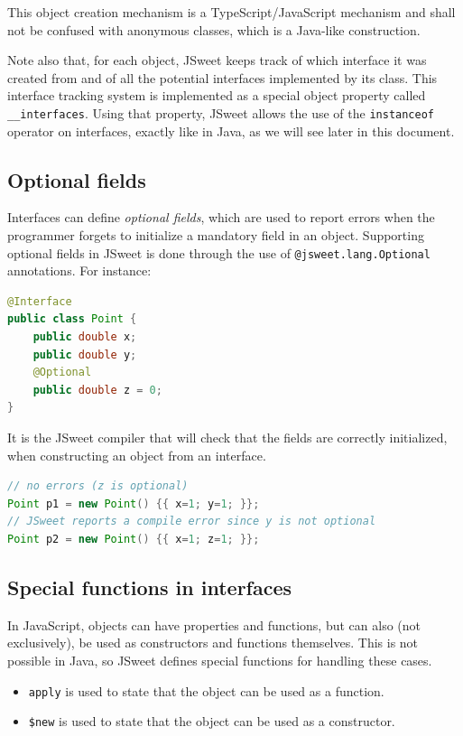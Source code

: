 \documentclass[a4paper]{report}
\begin{document}
This object creation mechanism is a TypeScript/JavaScript mechanism and shall not be confused with anonymous classes, which is a Java-like construction.

Note also that, for each object, JSweet keeps track of which interface it was created from and of all the potential interfaces implemented by its class. This interface tracking system is implemented as a special object property called \texttt{\_\_interfaces}. Using that property, JSweet allows the use of the \texttt{instanceof} operator on interfaces, exactly like in Java, as we will see later in this document.

\subsection{Optional fields}
 
Interfaces can define \emph{optional fields}, which are used to report errors when the programmer forgets to initialize a mandatory field in an object. Supporting optional fields in JSweet is done through the use of \texttt{@jsweet.lang.Optional} annotations. For instance:

\begin{lstlisting}[language=Java]
@Interface
public class Point {
	public double x;
	public double y;
	@Optional
	public double z = 0;
}
\end{lstlisting}

It is the JSweet compiler that will check that the fields are correctly initialized, when constructing an object from an interface.

\begin{lstlisting}[language=Java]
// no errors (z is optional)
Point p1 = new Point() {{ x=1; y=1; }};
// JSweet reports a compile error since y is not optional
Point p2 = new Point() {{ x=1; z=1; }};
\end{lstlisting}

\subsection{Special functions in interfaces}

In JavaScript, objects can have properties and functions, but can also (not exclusively), be used as constructors and functions themselves. This is not possible in Java, so JSweet defines special functions for handling these cases.

\begin{itemize}
\item \texttt{apply} is used to state that the object can be used as a function.
\item \texttt{\$new} is used to state that the object can be used as a constructor.
\end{itemize}
\end{document}

